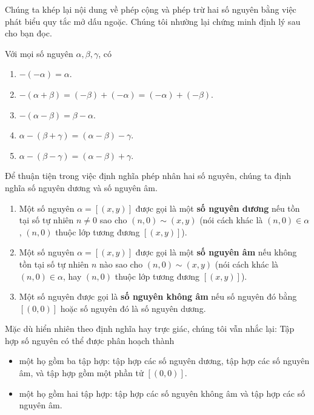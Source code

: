 Chúng ta khép lại nội dung về phép cộng và phép trừ hai số nguyên bằng việc phát biểu quy tắc mở dấu ngoặc. Chúng tôi nhường lại chứng minh định lý sau cho bạn đọc.

\begin{theorem}
    Với mọi số nguyên $\alpha, \beta, \gamma$, có
    \begin{enumerate}[label={(\roman*)}]
        \item $-(-\alpha) = \alpha$.
        \item $-(\alpha + \beta) = (-\beta) + (-\alpha) = (-\alpha) + (-\beta)$.
        \item $-(\alpha - \beta) = \beta - \alpha$.
        \item $\alpha - (\beta + \gamma) = (\alpha - \beta) - \gamma$.
        \item $\alpha - (\beta - \gamma) = (\alpha - \beta) + \gamma$.
    \end{enumerate}
\end{theorem}

Để thuận tiện trong việc định nghĩa phép nhân hai số nguyên, chúng ta định nghĩa số nguyên dương và số nguyên âm.
\begin{definition}
    \begin{enumerate}[label={(\roman*)}]
        \item Một số nguyên $\alpha = [(x, y)]$ được gọi là một \textbf{số nguyên dương} nếu tồn tại số tự nhiên $n\ne 0$ sao cho $(n, 0)\sim (x, y)$ (nói cách khác là $(n, 0)\in \alpha$, $(n, 0)$ thuộc lớp tương đương $[(x, y)]$).
        \item Một số nguyên $\alpha = [(x, y)]$ được gọi là một \textbf{số nguyên âm} nếu không tồn tại số tự nhiên $n$ nào sao cho $(n, 0)\sim (x, y)$ (nói cách khác là $(n, 0)\in \alpha$, hay $(n, 0)$ thuộc lớp tương đương $[(x, y)]$).
        \item Một số nguyên được gọi là \textbf{số nguyên không âm} nếu số nguyên đó bằng $[(0, 0)]$ hoặc số nguyên đó là số nguyên dương.
    \end{enumerate}
\end{definition}

Mặc dù hiển nhiên theo định nghĩa hay trực giác, chúng tôi vẫn nhắc lại: Tập hợp số nguyên có thể được phân hoạch thành
\begin{itemize}
    \item một họ gồm ba tập hợp: tập hợp các số nguyên dương, tập hợp các số nguyên âm, và tập hợp gồm một phần tử $[(0,0)]$.
    \item một họ gồm hai tập hợp: tập hợp các số nguyên không âm và tập hợp các số nguyên âm.
\end{itemize}

